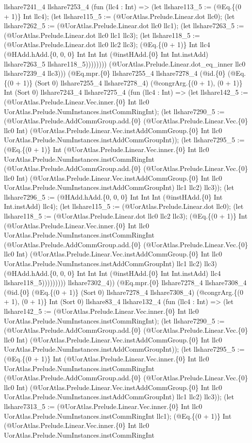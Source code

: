 \documentclass[11pt]{article}
\begin{document}
llshare7241\_4 llshare7253\_4 (fun (llc4 : Int) => (let llshare113\_5 := (@Eq.\{(0 + 1)\} Int llc4); (let llshare115\_5 := (@UorAtlas.Prelude.Linear.dot llc0); (let llshare7262\_5 := (@UorAtlas.Prelude.Linear.dot llc0 llc1); (let llshare7263\_5 := (@UorAtlas.Prelude.Linear.dot llc0 llc1 llc3); (let llshare118\_5 := (@UorAtlas.Prelude.Linear.dot llc0 llc2 llc3); (@Eq.\{(0 + 1)\} Int llc4 (@HAdd.hAdd.\{0, 0, 0\} Int Int Int (@instHAdd.\{0\} Int Int.instAdd) llshare7263\_5 llshare118\_5)))))))) (@UorAtlas.Prelude.Linear.dot\_eq\_inner llc0 llshare7239\_4 llc3))) (@Eq.mpr.\{0\} llshare7255\_4 llshare7278\_4 (@id.\{0\} (@Eq.\{(0 + 1)\} (Sort 0) llshare7255\_4 llshare7278\_4) (@congrArg.\{(0 + 1), (0 + 1)\} Int (Sort 0) llshare7243\_4 llshare7275\_4 (fun (llc4 : Int) => (let llshare142\_5 := (@UorAtlas.Prelude.Linear.Vec.inner.\{0\} Int llc0 UorAtlas.Prelude.NumInstances.instCommRingInt); (let llshare7290\_5 := (@UorAtlas.Prelude.AddCommGroup.add.\{0\} (@UorAtlas.Prelude.Linear.Vec.\{0\} llc0 Int) (@UorAtlas.Prelude.Linear.Vec.instAddCommGroup.\{0\} Int llc0 UorAtlas.Prelude.NumInstances.instAddCommGroupInt)); (let llshare7295\_5 := (@Eq.\{(0 + 1)\} Int (@UorAtlas.Prelude.Linear.Vec.inner.\{0\} Int llc0 UorAtlas.Prelude.NumInstances.instCommRingInt (@UorAtlas.Prelude.AddCommGroup.add.\{0\} (@UorAtlas.Prelude.Linear.Vec.\{0\} llc0 Int) (@UorAtlas.Prelude.Linear.Vec.instAddCommGroup.\{0\} Int llc0 UorAtlas.Prelude.NumInstances.instAddCommGroupInt) llc1 llc2) llc3)); (let llshare7296\_5 := (@HAdd.hAdd.\{0, 0, 0\} Int Int Int (@instHAdd.\{0\} Int Int.instAdd) llc4); (let llshare115\_5 := (@UorAtlas.Prelude.Linear.dot llc0); (let llshare118\_5 := (@UorAtlas.Prelude.Linear.dot llc0 llc2 llc3); (@Eq.\{(0 + 1)\} Int (@UorAtlas.Prelude.Linear.Vec.inner.\{0\} Int llc0 UorAtlas.Prelude.NumInstances.instCommRingInt (@UorAtlas.Prelude.AddCommGroup.add.\{0\} (@UorAtlas.Prelude.Linear.Vec.\{0\} llc0 Int) (@UorAtlas.Prelude.Linear.Vec.instAddCommGroup.\{0\} Int llc0 UorAtlas.Prelude.NumInstances.instAddCommGroupInt) llc1 llc2) llc3) (@HAdd.hAdd.\{0, 0, 0\} Int Int Int (@instHAdd.\{0\} Int Int.instAdd) llc4 llshare118\_5))))))))) llshare7302\_4)) (@Eq.mpr.\{0\} llshare7278\_4 llshare7308\_4 (@id.\{0\} (@Eq.\{(0 + 1)\} (Sort 0) llshare7278\_4 llshare7308\_4) (@congrArg.\{(0 + 1), (0 + 1)\} Int (Sort 0) llshare83\_4 llshare132\_4 (fun (llc4 : Int) => (let llshare142\_5 := (@UorAtlas.Prelude.Linear.Vec.inner.\{0\} Int llc0 UorAtlas.Prelude.NumInstances.instCommRingInt); (let llshare7290\_5 := (@UorAtlas.Prelude.AddCommGroup.add.\{0\} (@UorAtlas.Prelude.Linear.Vec.\{0\} llc0 Int) (@UorAtlas.Prelude.Linear.Vec.instAddCommGroup.\{0\} Int llc0 UorAtlas.Prelude.NumInstances.instAddCommGroupInt)); (let llshare7295\_5 := (@Eq.\{(0 + 1)\} Int (@UorAtlas.Prelude.Linear.Vec.inner.\{0\} Int llc0 UorAtlas.Prelude.NumInstances.instCommRingInt (@UorAtlas.Prelude.AddCommGroup.add.\{0\} (@UorAtlas.Prelude.Linear.Vec.\{0\} llc0 Int) (@UorAtlas.Prelude.Linear.Vec.instAddCommGroup.\{0\} Int llc0 UorAtlas.Prelude.NumInstances.instAddCommGroupInt) llc1 llc2) llc3)); (let llshare7313\_5 := (@UorAtlas.Prelude.Linear.Vec.inner.\{0\} Int llc0 UorAtlas.Prelude.NumInstances.instCommRingInt llc1); (@Eq.\{(0 + 1)\} Int (@UorAtlas.Prelude.Linear.Vec.inner.\{0\} Int llc0 UorAtlas.Prelude.NumInstances.instCommRingInt 
\end{document}
